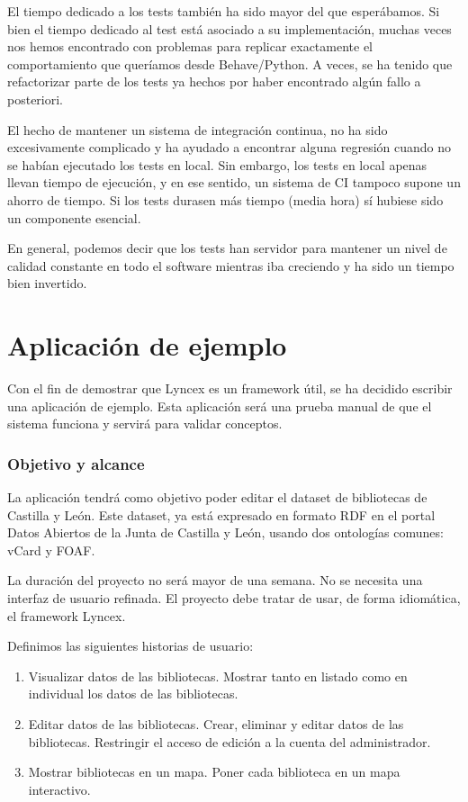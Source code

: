\documentclass[12pt]{report} %
\begin{document}
El tiempo dedicado a los tests también ha sido mayor del que esperábamos. Si bien el tiempo dedicado al test está asociado a su implementación, muchas veces nos hemos encontrado con problemas para replicar exactamente el comportamiento que queríamos desde Behave/Python. A veces, se ha tenido que refactorizar parte de los tests ya hechos por haber encontrado algún fallo a posteriori.

El hecho de mantener un sistema de integración continua, no ha sido excesivamente complicado y ha ayudado a encontrar alguna regresión cuando no se habían ejecutado los tests en local. Sin embargo, los tests en local apenas llevan tiempo de ejecución, y en ese sentido, un sistema de CI tampoco supone un ahorro de tiempo. Si los tests durasen más tiempo (media hora) sí hubiese sido un componente esencial.

En general, podemos decir que los tests han servidor para mantener un nivel de calidad constante en todo el software mientras iba creciendo y ha sido un tiempo bien invertido.

\chapter{Aplicación de ejemplo}

Con el fin de demostrar que Lyncex es un framework útil, se ha decidido escribir una aplicación de ejemplo. Esta aplicación será una prueba manual de que el sistema funciona y servirá para validar conceptos.

\subsection{Objetivo y alcance}

La aplicación tendrá como objetivo poder editar el dataset de bibliotecas de Castilla y León. Este dataset, ya está expresado en formato RDF en el portal Datos Abiertos de la Junta de Castilla y León, usando dos ontologías comunes: vCard y FOAF.

La duración del proyecto no será mayor de una semana. No se necesita una interfaz de usuario refinada. El proyecto debe tratar de usar, de forma idiomática, el framework Lyncex.

Definimos las siguientes historias de usuario:
\begin{enumerate}
    \item Visualizar datos de las bibliotecas. Mostrar tanto en listado como en individual los datos de las bibliotecas.
    \item Editar datos de las bibliotecas. Crear, eliminar y editar datos de las bibliotecas. Restringir el acceso de edición a la cuenta del administrador.
    \item Mostrar bibliotecas en un mapa. Poner cada biblioteca en un mapa interactivo.
\end{enumerate}
\end{document}
